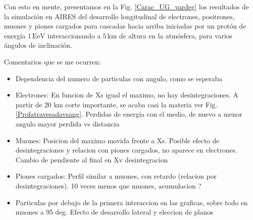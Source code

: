 \documentclass[12 pt, a4paper]{article} %
\numberwithin{equation}{section}
\numberwithin{figure}{section}
\numberwithin{table}{section}
\begin{document}
Con esto en mente, presentamos en la Fig. \ref{Carac_UG_vardeg} los resultados de la simulación en AIRES del desarrollo longitudinal de electrones, positrones, muones y piones cargados para cascadas hacia arriba iniciadas por un protón de energía $1\,\mathrm{EeV}$ interaccionando a $5\,\mathrm{km}$ de altura en la atmósfera, para varios ángulos de inclinación.

Comentarios que se me ocurren:
\begin{itemize}
	\item Dependencia del numero de particulas con angulo, como se esperaba
	\item Electrones: En funcion de Xs igual el maximo, no hay desintegraciones. A partir de 20 km corte importante, se acaba casi la materia ver Fig. \ref{Profatravesadavsang}. Perdidas de energia con el medio, de nuevo a menor angulo mayor perdida vs distancia
	\item Muones: Posicion del maximo movida frente a Xs. Posible efecto de desintegraciones y relacion con piones cargados, no aparece en electrones. Cambio de pendiente al final en Xv desintegracion
	\item Piones cargados: Perfil similar a muones, con retardo (relacion por desintegraciones). 10 veces menos que muones, acumulacion ?
	\item Particulas por debajo de la primera interaccion en las graficas, sobre todo en muones a 95 deg. Efecto de desarrollo lateral y eleccion de planos
\end{itemize}
\end{document}
